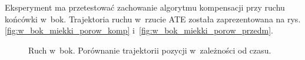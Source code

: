 Eksperyment ma przetestować zachowanie algorytmu kompensacji przy ruchu końcówki w~bok. Trajektoria ruchu w~rzucie ATE została zaprezentowana na rys. \ref{fig:w_bok_miekki_porow_komp} i~\ref{fig:w_bok_miekki_porow_przedm}.
\begin{figure}[H]
	\centering
	\hfill
	

	\caption{Ruch w~bok. Porównanie trajektorii pozycji w~zależności od czasu.}
	\label{fig:w_bok_miekki_a}

\end{figure}

